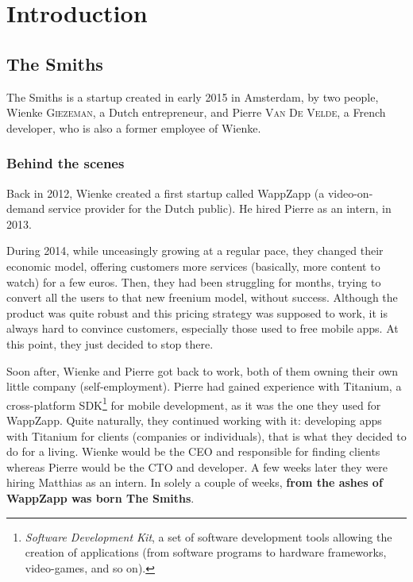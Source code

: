 \chapter{Introduction}
\section{The Smiths}

The Smiths is a startup created in early 2015 in Amsterdam, by two people, Wienke \textsc{Giezeman}, a Dutch entrepreneur, and Pierre \textsc{Van De Velde}, a French developer, who is also a former employee of Wienke.

\subsection{Behind the scenes}

Back in 2012, Wienke created a first startup called WappZapp (a video-on-demand service provider for the Dutch public). He hired Pierre as an intern, in 2013.

\medskip

During 2014, while unceasingly growing at a regular pace, they changed their economic model, offering customers more services (basically, more content to watch) for a few euros. Then, they had been struggling for months, trying to convert all the users to that new freenium model, without success. Although the product was quite robust and this pricing strategy was supposed to work, it is always hard to convince customers, especially those used to free mobile apps. At this point, they just decided to stop there.

\medskip

Soon after, Wienke and Pierre got back to work, both of them owning their own little company (self-employment). Pierre had gained experience with Titanium, a cross-platform SDK\footnote{\textit{Software Development Kit}, a set of software development tools allowing the creation of applications (from software programs to hardware frameworks, video-games, and so on).} for mobile development, as it was the one they used for WappZapp. Quite naturally, they continued working with it: developing apps with Titanium for clients (companies or individuals), that is what they decided to do for a living. Wienke would be the CEO and responsible for finding clients whereas Pierre would be the CTO and developer. A few weeks later they were hiring Matthias as an intern. In solely a couple of weeks, \textbf{from the ashes of WappZapp was born The Smiths}.

